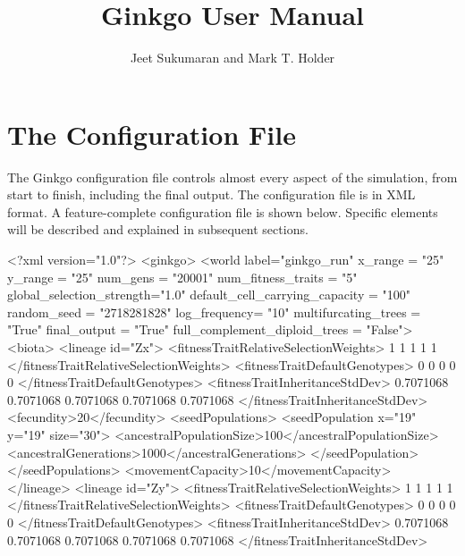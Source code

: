 \documentclass[11pt]{article}
\title{Ginkgo User Manual}
\author{Jeet Sukumaran and Mark T. Holder}
\date{}                                           %
\begin{document}
\maketitle

\part{The Configuration File}

The Ginkgo configuration file controls almost every aspect of the simulation, from start to finish, including the final output.
The configuration file is in XML format.
A feature-complete configuration file is shown below.
Specific elements will be described and explained in subsequent sections.
\begin{ginkgoxml}
<?xml version="1.0"?>
<ginkgo>
    <world label="ginkgo_run"
           x_range = "25"
           y_range = "25"
           num_gens = "20001"
           num_fitness_traits = "5"
           global_selection_strength="1.0"
           default_cell_carrying_capacity = "100"
           random_seed = "2718281828"
           log_frequency= "10"
           multifurcating_trees = "True"
           final_output = "True"
           full_complement_diploid_trees = "False">
        <biota>
            <lineage id="Zx">
                <fitnessTraitRelativeSelectionWeights>
                	1 1 1 1 1
                </fitnessTraitRelativeSelectionWeights>
                <fitnessTraitDefaultGenotypes>
                	0 0 0 0 0
                </fitnessTraitDefaultGenotypes>
                <fitnessTraitInheritanceStdDev>
                	0.7071068 0.7071068 0.7071068 0.7071068 0.7071068
                </fitnessTraitInheritanceStdDev>
                <fecundity>20</fecundity>
                <seedPopulations>
                    <seedPopulation x="19" y="19" size="30">
                        <ancestralPopulationSize>100</ancestralPopulationSize>
                        <ancestralGenerations>1000</ancestralGenerations>
                    </seedPopulation>
                </seedPopulations>
                <movementCapacity>10</movementCapacity>
            </lineage>
            <lineage id="Zy">
                <fitnessTraitRelativeSelectionWeights>
                	1 1 1 1 1
                </fitnessTraitRelativeSelectionWeights>
                <fitnessTraitDefaultGenotypes>
                	0 0 0 0 0
                </fitnessTraitDefaultGenotypes>
                <fitnessTraitInheritanceStdDev>
                	0.7071068 0.7071068 0.7071068 0.7071068 0.7071068
                </fitnessTraitInheritanceStdDev>

\end{ginkgoxml}
\end{document}
